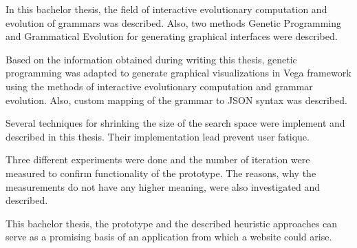 \label{Conclusion}

In this bachelor thesis, the field of interactive evolutionary computation and evolution of grammars was described. Also, two methods Genetic Programming and Grammatical Evolution for generating graphical interfaces were described.

Based on the information obtained during writing this thesis, genetic programming was adapted to generate graphical visualizations in Vega framework using the methods of interactive evolutionary computation and grammar evolution. Also, custom mapping of the grammar to JSON syntax was described.

Several techniques for shrinking the size of the search space were implement and described in this thesis. Their implementation lead prevent user fatique.

Three different experiments were done and the number of iteration were measured to confirm functionality of the prototype. The reasons, why the measurements do not have any higher meaning, were also investigated and described.

This bachelor thesis, the prototype and the described heuristic approaches can serve as a promising basis of an application from which a website could arise.
